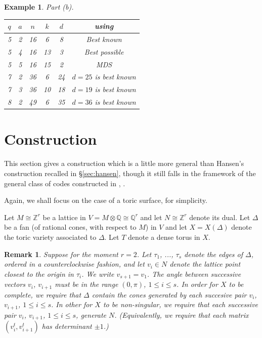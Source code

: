 \documentclass[12pt]{article}
\newtheorem{example}[theorem]{Example}
\newtheorem{remark}[theorem]{Remark}
\def\qqq{\mathbb{Q}}
\def\zzz{\mathbb{Z}}
\begin{document}
\begin{example}

Part (b).

\begin{center}
\begin{tabular}{|c|c|c|c|c|c|}\hline
$q$ & $a$ & $n$ & $k$ & $d$ & using \cite{B}\\ \hline
5 & 2 &  16 & 6 & 8  &Best known\\
5 & 4 &  16 & 13 & 3  & Best possible  \\
5 & 5 &  16 & 15 & 2  & MDS\\

7 & 2 &  36 & 6 & 24  & $d=25$ is best known\\ 
7 & 3 &  36 & 10 & 18  & $d=19$ is best known \\ 

8 & 2 &  49 & 6 & 35  & $d=36$ is best known  \\ 

\hline
\end{tabular}

\end{center}

\end{example}

\section{Construction}
\label{sec:toric}

This section gives a construction which is a little more 
general than Hansen's construction recalled in
\S \ref{sec:hansen}, though it still
falls in the framework of the general class of
codes constructed in \cite{Han2}, \cite{FL}.

Again, we shall focus on the case of a toric surface,
for simplicity.

Let $M\cong \zzz^r$ be a lattice in $V=M\otimes \qqq\cong \qqq^r$
and let $N\cong \zzz^r$ denote its dual.
Let $\Delta$ be a fan (of rational cones, with
respect to $M$) in $V$ and let $X=X(\Delta)$ denote the
toric variety associated to $\Delta$. 
Let $T$ denote a dense torus in $X$.

\begin{remark}
Suppose for the moment $r=2$.
Let $\tau_1$, ..., $\tau_s$ denote the edges
of $\Delta$, ordered in a counterclockwise fashion, 
and let $v_i\in N$ denote the 
lattice point closest to the origin in $\tau_i$.
We write $v_{s+1}=v_1$.
The angle between successive vectors $v_i$, $v_{i+1}$ must be
in the range $(0,\pi)$, $1\leq i\leq s$. 
In order for $X$ to be complete, we require that
$\Delta$ contain the cones generated by each succesive pair
$v_i$, $v_{i+1}$, $1\leq i\leq s$. 
In other for $X$ to
be non-singular, we require that each successive pair
$v_i$, $v_{i+1}$, $1\leq i\leq s$, generate $N$.
(Equivalently, we require that each matrix $(v_i^t,v_{i+1}^t)$
has determinant $\pm 1$.)
\end{remark}
\end{document}
